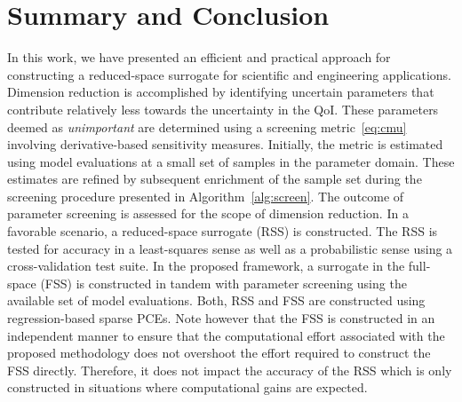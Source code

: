 \section{Summary and Conclusion}
\label{sec:disc}


In this work, we have presented an efficient and practical approach for constructing
a reduced-space
surrogate for scientific and engineering applications. Dimension reduction is accomplished
by identifying uncertain parameters that contribute relatively less towards the uncertainty
in the QoI. These parameters deemed as \textit{unimportant} are determined
using a screening metric~\eqref{eq:cmu} involving derivative-based sensitivity
measures. Initially, the metric is estimated
using model evaluations at a small set of samples in the parameter domain. These
estimates are refined by subsequent enrichment of the sample set during the screening
procedure presented in Algorithm~\ref{alg:screen}. The outcome of parameter screening is
assessed for the scope of dimension reduction. In a favorable scenario, a reduced-space
surrogate (RSS) is constructed. The RSS is tested for accuracy in a least-squares sense
as well as a probabilistic sense using a cross-validation test suite. In the proposed framework,
a surrogate in the full-space (FSS) is constructed in tandem with parameter screening using
the available set of model evaluations. Both, RSS and FSS are
constructed using regression-based sparse PCEs. Note however that the FSS is
constructed in an independent manner to ensure that the computational effort associated
with the proposed methodology does not overshoot the effort required to construct the 
FSS directly. Therefore, it does not impact the accuracy of the RSS which is only
constructed in situations where computational gains are expected.

